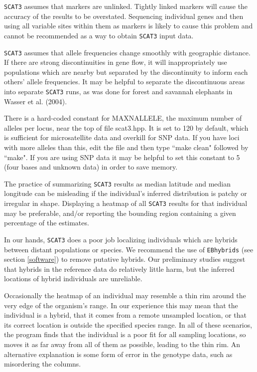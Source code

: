 \documentclass[10pt,titlepage,times,letterpaper]{article}
\def\SCAT{{\tt SCAT3} }
\begin{document}
\SCAT assumes that markers are unlinked.  Tightly linked markers will
cause the accuracy of the results to be overstated.  Sequencing individual
genes and then using all variable sites within them as markers is likely
to cause this problem and cannot be recommended as a way to obtain \SCAT
input data.

\SCAT assumes that allele frequencies change smoothly with geographic
distance.  If there are strong discontinuities in gene flow, it will
inappropriately use populations which are nearby but separated by the
discontinuity to inform each others' allele frequencies.  It may be
helpful to separate the discontinuous areas into separate \SCAT runs,
as was done for forest and savannah elephants in Wasser et al. (2004).

There is a hard-coded constant for MAXNALLELE, the maximum number
of alleles per locus, near the top of file scat3.hpp.  It is set to 120
by default, which is sufficient for microsatellite data and overkill for
SNP data.  If you have loci with more alleles than this, edit the
file and then type ``make clean" followed by ``make".  If you are using
SNP data it may be helpful to set this constant to 5 (four bases and unknown
data) in order to save memory.

The practice of summarizing \SCAT results as median latitude and
median longitude can be misleading if the individual's
inferred distribution is patchy or irregular in shape.  Displaying
a heatmap of all \SCAT results for that individual may be preferable,
and/or reporting the bounding region containing a given percentage
of the estimates.

In our hands, \SCAT does a poor job localizing individuals which are
hybrids between distant populations or species.  We recommend the use
of {\tt EBhybrids} (see section \ref{software}) to remove putative hybrids.
Our preliminary studies suggest that hybrids in the reference data do
relatively little harm, but the inferred locations of hybrid individuals are
unreliable. 

Occasionally the heatmap of an individual may resemble a thin rim around the
very edge of the organism's range.  In our experience this may mean that
the individual is a hybrid, that it comes from a remote unsampled location,
or that its correct location is outside the specified species range.
In all of these scenarios, the program finds that the individual is a poor 
fit for all sampling locations, so moves it as far away from all of them as 
possible, leading to the thin rim.  An alternative explanation is some form 
of error in the genotype data, such as misordering the columns.
\end{document}
